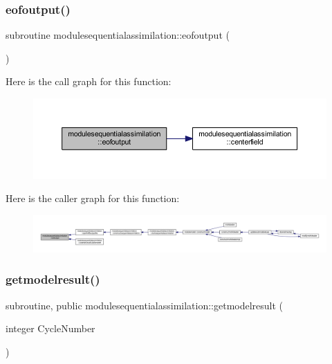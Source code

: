\subsubsection{\texorpdfstring{eofoutput()}{eofoutput()}}
{\footnotesize\ttfamily subroutine modulesequentialassimilation\+::eofoutput (\begin{DoxyParamCaption}{ }\end{DoxyParamCaption})\hspace{0.3cm}{\ttfamily [private]}}

Here is the call graph for this function\+:\nopagebreak
\begin{figure}[H]
\begin{center}
\leavevmode
\includegraphics[width=350pt]{namespacemodulesequentialassimilation_a4f7834d6d8d5c26c37c74e758a14b521_cgraph}
\end{center}
\end{figure}
Here is the caller graph for this function\+:\nopagebreak
\begin{figure}[H]
\begin{center}
\leavevmode
\includegraphics[width=350pt]{namespacemodulesequentialassimilation_a4f7834d6d8d5c26c37c74e758a14b521_icgraph}
\end{center}
\end{figure}
\mbox{\label{namespacemodulesequentialassimilation_a817e5028ea901157ba1c90a514305c15}} 
\subsubsection{\texorpdfstring{getmodelresult()}{getmodelresult()}}
{\footnotesize\ttfamily subroutine, public modulesequentialassimilation\+::getmodelresult (\begin{DoxyParamCaption}\item[{integer}]{Cycle\+Number }\end{DoxyParamCaption})}

